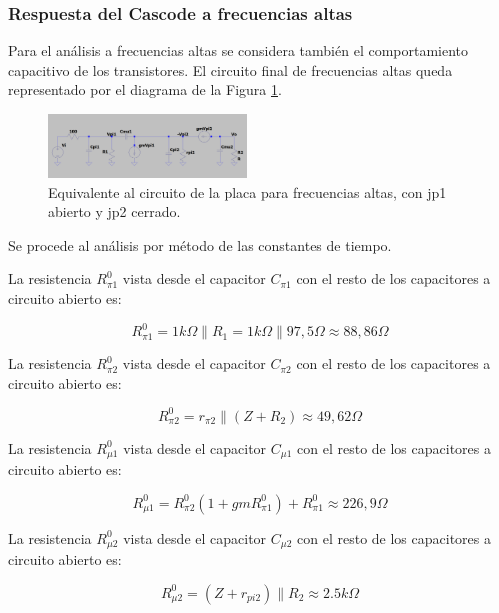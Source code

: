 \documentclass[letterpaper, 10 pt, conference]{ieeeconf}  %
\begin{document}
\subsubsection{Respuesta del Cascode a frecuencias altas}

Para el análisis a frecuencias altas se considera también el comportamiento capacitivo de los transistores. El circuito final de frecuencias altas queda representado por el diagrama de la Figura \ref{fig:cascode_freq_altas}.

\begin{figure}[H]
  \centering
  \includegraphics[width=0.47\textwidth]{imagenes/freq acltas cascode.png}
  \caption{Equivalente al circuito de la placa para frecuencias altas, con jp1 abierto y jp2 cerrado.}
  \label{fig:cascode_freq_altas}
\end{figure}

Se procede al análisis por método de las constantes de tiempo.

La resistencia $R_{\pi1}^0$ vista desde el capacitor $C_{\pi1}$ con el resto de los capacitores a circuito abierto es:

\begin{equation}
    R_{\pi1}^0 = 1k\Omega \parallel R_1 = 1k\Omega \parallel 97,5\Omega \approx 88,86\Omega
\end{equation}

La resistencia $R_{\pi2}^0$ vista desde el capacitor $C_{\pi2}$ con el resto de los capacitores a circuito abierto es:

\begin{equation}
    R_{\pi2}^0 = r_{\pi2} \parallel (Z + R_2) \approx 49,62\Omega
\end{equation}

La resistencia $R_{\mu1}^0$ vista desde el capacitor $C_{\mu1}$ con el resto de los capacitores a circuito abierto es:

\begin{equation}
    R_{\mu1}^0 = R_{\pi2}^0(1 + gmR_{\pi1}^0) + R_{\pi1}^0 \approx 226,9\Omega
\end{equation}

La resistencia $R_{\mu2}^0$ vista desde el capacitor $C_{\mu2}$ con el resto de los capacitores a circuito abierto es:

\begin{equation}
    R_{\mu2}^0 = (Z + r_{pi2})\parallel R_2 \approx 2.5 k\Omega
\end{equation}
\end{document}
